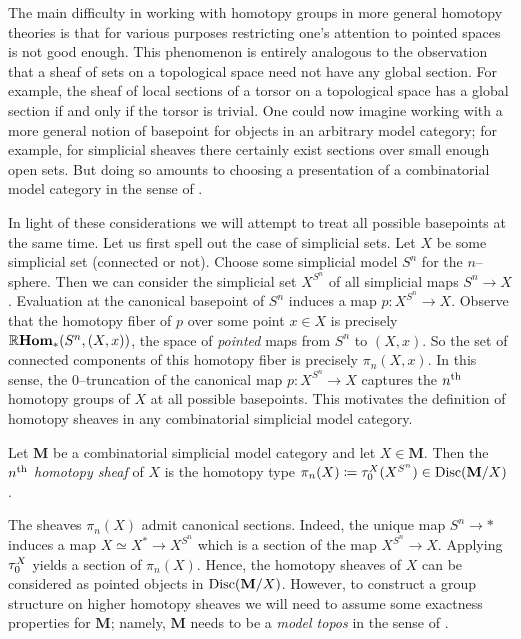 The main difficulty in working with homotopy groups in more general
homotopy theories is that for various purposes restricting one's
attention to pointed spaces is not good enough. This phenomenon is
entirely analogous to the observation that a sheaf of sets on a
topological space need not have any global section. For example, the
sheaf of local sections of a torsor on a topological space has a
global section if and only if the torsor is trivial. One could now
imagine working with a more general notion of basepoint for objects in
an arbitrary model category; for example, for simplicial sheaves there
certainly exist sections over small enough open sets. But doing so
amounts to choosing a presentation of a combinatorial model category
in the sense of \cite{mr1870516}.

In light of these considerations we will attempt to treat all possible
basepoints at the same time. Let us first spell out the case of
simplicial sets. Let \(X\) be some simplicial set (connected or
not). Choose some simplicial model \(S^{n}\) for the
\(n\)--sphere. Then we can consider the simplicial set \(X^{S^{n}}\)
of all simplicial maps \(S^{n}\to X\). Evaluation at the canonical
basepoint of \(S^{n}\) induces a map \(p\colon X^{S^{n}}\to
X\). Observe that the homotopy fiber of \(p\) over some point \(x\in
X\) is precisely \(\operatorname{\mathbb{R}\textnormal{\bfseries Hom}}_{*}(S^{n}, (X,x))\), the space of
\emph{pointed} maps from \(S^{n}\) to \((X,x)\). So the set of
connected components of this homotopy fiber is precisely
\(\pi_{n}(X,x)\). In this sense, the \(0\)--truncation of the
canonical map \(p\colon X^{S^{n}}\to X\) captures the
\(n\textsuperscript{th}\) homotopy groups of \(X\) at all possible
basepoints. This motivates the definition of homotopy sheaves in any
combinatorial simplicial model category.

\begin{definition}
  Let \(\mathbf M\) be a combinatorial simplicial model category and
  let \(X\in\mathbf M\). Then the \emph{\(n\textsuperscript{th}\)
    homotopy sheaf} of \(X\) is the homotopy type
  \(\pi_{n}(X)\coloneqq\tau_{0}^{X}(X^{S^{n}})\in\operatorname{\textnormal{Disc}}(\mathbf
  M/X)\).
\end{definition}

The sheaves \(\pi_{n}(X)\) admit canonical sections. Indeed, the
unique map \(S^{n}\to *\) induces a map \(X\simeq X^{*}\to X^{S^{n}}\)
which is a section of the map \(X^{S^{n}}\to X\). Applying
\(\tau_{0}^{X}\) yields a section of \(\pi_{n}(X)\). Hence, the
homotopy sheaves of \(X\) can be considered as pointed objects in
\(\operatorname{\textnormal{Disc}}(\mathbf M/X)\). However, to construct a group structure on
higher homotopy sheaves we will need to assume some exactness
properties for \(\mathbf M\); namely, \(\mathbf M\) needs to be a
\emph{model topos} in the sense of \cite{rezkhomotopytoposes}.

